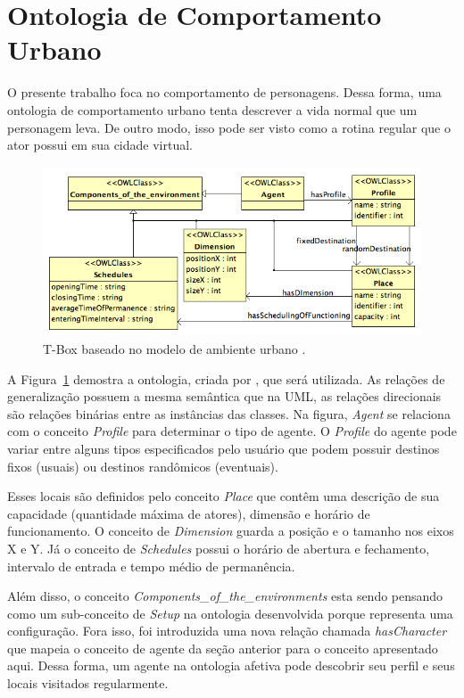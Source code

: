 \section{Ontologia de Comportamento Urbano} \label{ch:aec:ocu}

O presente trabalho foca no comportamento de personagens. Dessa forma, uma
ontologia de comportamento urbano tenta descrever a vida normal que um
personagem leva. De outro modo, isso pode ser visto como a rotina regular que
o ator possui em sua cidade virtual.

\begin{figure}
  \centering
    \includegraphics[width=150mm]{figuras/uem-tbox.png}
  \caption[T-Box baseado no modelo de ambiente urbano.]{T-Box baseado no modelo de ambiente urbano \cite{paiva2005ontology}.}
  \label{fig:UEM:TBOX}
\end{figure}

A Figura~\ref{fig:UEM:TBOX} demostra a ontologia, criada por
\citet{paiva2005ontology}, que será utilizada. As relações de generalização
possuem a mesma semântica que na UML, as relações direcionais são relações
binárias entre as instâncias das classes. Na figura, \emph{Agent} se relaciona
com o conceito \emph{Profile} para determinar o tipo de agente. O
\emph{Profile} do agente pode variar entre alguns tipos especificados pelo
usuário que podem possuir destinos fixos (usuais) ou destinos randômicos
(eventuais).

Esses locais são definidos pelo conceito \emph{Place} que contêm
uma descrição de sua capacidade (quantidade máxima de atores), dimensão
e horário de funcionamento. O conceito de \emph{Dimension} guarda a posição e
o tamanho nos eixos X e Y. Já o conceito de \emph{Schedules} possui o horário
de abertura e fechamento, intervalo de entrada e tempo médio de permanência.

Além disso, o conceito \emph{Components\_of\_the\_environments} esta sendo
pensando como um sub-conceito de \emph{Setup} na ontologia
desenvolvida porque representa uma configuração.
Fora isso, foi introduzida uma nova relação chamada \emph{hasCharacter} que
mapeia o conceito de agente da seção anterior para o conceito apresentado
aqui. Dessa forma, um agente na ontologia afetiva pode descobrir seu perfil e
seus locais visitados regularmente.

